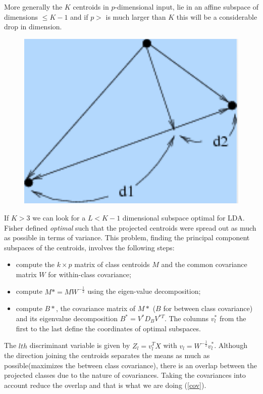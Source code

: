 \documentclass[12pt, letterpaper]{article}
\theoremstyle{definition}
\begin{document}
More generally the $K$ centroids in $p$-dimensional input, lie in an affine subspace of dimensions $\le K-1$ and if $p>$ is much larger than $K$ this will be a considerable drop in dimension.


\begin{figure}
\label{proj}
\includegraphics[scale=0.4]{img/proj}
\end{figure}

If $K>3$ we can look for a $L<K-1$ dimensional subspace optimal for LDA. Fisher defined \textit{optimal} such that the projected centroids were spread out as much as possible in terms of variance.
This problem, finding the principal component subspaces of the centroids, involves the following steps:
\begin{itemize}
\item compute the $k\times p$ matrix of class centroids $M$ and the common covariance matrix $W$ for within-class covariance;
\item compute $M*=MW^{-\frac{1}{2}}$ using the eigen-value decomposition;
\item compute $B*$, the covariance matrix of $M*$ ($B$ for between class covariance) and its eigenvalue decomposition $B^{*}=V^{*}D_BV^{*T}$. The columns $v^*_l$ from the first to the last define the coordinates of optimal subspaces.
\end{itemize}
The $lth$ discriminant variable is given by $Z_l =  v_l^TX$ with $v_l=W^{-\frac{1}{2}} v^*_l$.  Although the direction joining the centroids separates the means as much as possible(maximizes the between class covariance), there is an overlap between the projected classes due to the nature of covariances. Taking the covariances into account reduce the overlap and that is what we are doing (\ref{cov}).
\end{document}
